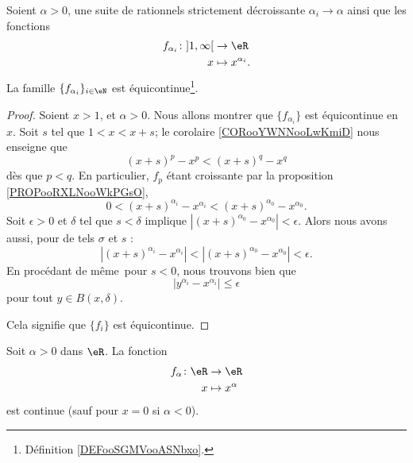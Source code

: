 \begin{lemma}   \label{LEMooQTNKooLVEytN}
    Soient \( \alpha>0\), une suite de rationnels strictement décroissante \( \alpha_i\to \alpha\) ainsi que les fonctions
    \begin{equation}
        \begin{aligned}
        f_{\alpha_i}\colon \mathopen] 1 , \infty \mathclose[&\to \eR \\
            x&\mapsto x^{\alpha_i}. 
        \end{aligned}
    \end{equation}
    La famille \( \{ f_{\alpha_i} \}_{i\in \eN}\) est équicontinue\footnote{Définition \ref{DEFooSGMVooASNbxo}.}.
\end{lemma}

\begin{proof}
    Soient \( x>1\), et \( \alpha>0\). Nous allons montrer que \( \{ f_{\alpha_i} \}\) est équicontinue en \( x\). Soit \( s\) tel que \( 1<x<x+s\); le corolaire \ref{CORooYWNNooLwKmiD} nous enseigne que 
    \begin{equation}
        (x+s)^p-x^p<(x+s)^q-x^q
    \end{equation}
    dès que \( p<q\). En particulier, \( f_p\) étant croissante par la proposition \ref{PROPooRXLNooWkPGsO},
    \begin{equation}
        0<(x+s)^{\alpha_i}-x^{\alpha_i}<(x+s)^{\alpha_0}-x^{\alpha_0}.
    \end{equation}
    Soit \( \epsilon>0\) et \( \delta\) tel que \( s<\delta\) implique \( | (x+s)^{\alpha_0}-x^{\alpha_0} |<\epsilon\). Alors nous avons aussi, pour de tels \( \sigma\) et \( s\) :
    \begin{equation}
        |(x+s)^{\alpha_i}-x^{\alpha_i}|<|(x+s)^{\alpha_0}-x^{\alpha_0}|<\epsilon.
    \end{equation}
    En procédant de même\ pour \( s<0\), nous trouvons bien que
    \begin{equation}
        | y^{\alpha_i}-x^{\alpha_i} |\leq \epsilon
    \end{equation}
    pour tout \( y\in B(x,\delta)\).

    Cela signifie que \( \{ f_i \}\) est équicontinue.
\end{proof}


\begin{proposition}      \label{PROPooUQNZooSSHLqr}
    Soit \( \alpha>0\) dans \( \eR\). La fonction
    \begin{equation}
        \begin{aligned}
            f_{\alpha}\colon \eR&\to \eR \\
            x&\mapsto x^{\alpha} 
        \end{aligned}
    \end{equation}
    est continue (sauf pour \( x=0\) si \( \alpha<0\)).
\end{proposition}

